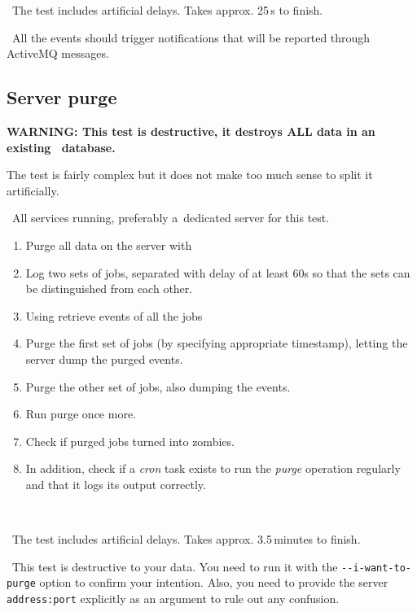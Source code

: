 \note\ The test includes artificial delays. Takes approx. 25\,s to finish.

\result\ All the events should trigger notifications that will be reported 
through ActiveMQ messages.





\subsection{Server purge}

\textbf{WARNING: This test is destructive, it destroys ALL data in an
existing \LB\ database.}

The test is fairly complex but it does not make too much sense to split it
artificially.

\req\ All \LB services running, preferably a~dedicated server for this test.

\what
\begin{enumerate}
\item Purge all data on the server with 
\item Log two sets of jobs, separated with delay of at least 60s so
that the sets can be distinguished from each other.
\item \label{purge1}
Using  retrieve events of all the jobs
\item \label{purge2}
Purge the first set of jobs (by specifying appropriate timestamp),
letting the server dump the purged events.
\item \label{purge3} Purge the other set of jobs, also dumping the events.
\item \label{purge4} Run purge once more.
\item Check if purged jobs turned into zombies.
\item In addition, check if a \emph{cron} task exists to run the \emph{purge} operation regularly and that it logs its output correctly.
\end{enumerate}

\how\ 

\note\ The test includes artificial delays. Takes approx. 3.5\,minutes to finish.

\note\ This test is destructive to your data. You need to run it with the \texttt{-{}-i-want-to-purge} option to confirm your intention. Also, you need to provide the \LB server \texttt{address:port} explicitly as an argument to rule out any confusion. 

